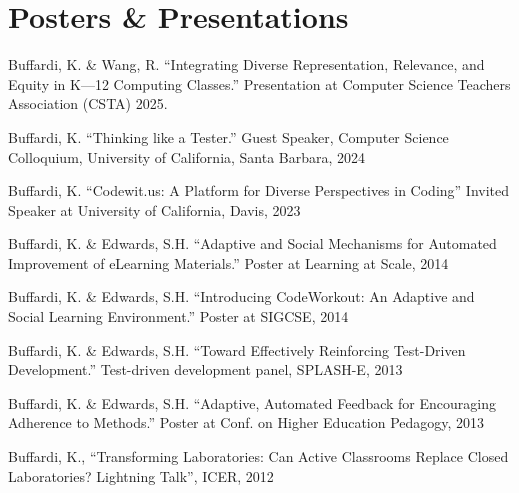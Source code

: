 \documentclass[10pt,letterpaper]{article}
\begin{document}
\section*{Posters \& Presentations}
{\small
\noindent\makebox[2.6em][l]{\textbf{[p12]}}\parbox[t]{\dimexpr\linewidth-2.6em\relax}{Buffardi, K. \& Wang, R. ``Integrating Diverse Representation, Relevance, and Equity in K---12 Computing Classes.'' Presentation at Computer Science Teachers Association (CSTA) 2025.}\par
\vspace{0.15em}
\noindent\makebox[2.6em][l]{\textbf{[p11]}}\parbox[t]{\dimexpr\linewidth-2.6em\relax}{Buffardi, K. ``Thinking like a Tester.'' Guest Speaker, Computer Science Colloquium, University of California, Santa Barbara, 2024}\par
\vspace{0.15em}
\noindent\makebox[2.6em][l]{\textbf{[p10]}}\parbox[t]{\dimexpr\linewidth-2.6em\relax}{Buffardi, K. ``Codewit.us: A Platform for Diverse Perspectives in Coding'' Invited Speaker at University of California, Davis, 2023}\par
\vspace{0.15em}
\noindent\makebox[2.6em][l]{\textbf{[p09]}}\parbox[t]{\dimexpr\linewidth-2.6em\relax}{Buffardi, K. \& Edwards, S.H. ``Adaptive and Social Mechanisms for Automated Improvement of eLearning Materials.'' Poster at Learning at Scale, 2014}\par
\vspace{0.15em}
\noindent\makebox[2.6em][l]{\textbf{[p08]}}\parbox[t]{\dimexpr\linewidth-2.6em\relax}{Buffardi, K. \& Edwards, S.H. ``Introducing CodeWorkout: An Adaptive and Social Learning Environment.'' Poster at SIGCSE, 2014}\par
\vspace{0.15em}
\noindent\makebox[2.6em][l]{\textbf{[p07]}}\parbox[t]{\dimexpr\linewidth-2.6em\relax}{Buffardi, K. \& Edwards, S.H. ``Toward Effectively Reinforcing Test-Driven Development.'' Test-driven development panel, SPLASH-E, 2013}\par
\vspace{0.15em}
\noindent\makebox[2.6em][l]{\textbf{[p06]}}\parbox[t]{\dimexpr\linewidth-2.6em\relax}{Buffardi, K. \& Edwards, S.H. ``Adaptive, Automated Feedback for Encouraging Adherence to Methods.'' Poster at Conf. on Higher Education Pedagogy, 2013}\par
\vspace{0.15em}
\noindent\makebox[2.6em][l]{\textbf{[p05]}}\parbox[t]{\dimexpr\linewidth-2.6em\relax}{Buffardi, K., ``Transforming Laboratories: Can Active Classrooms Replace Closed Laboratories? Lightning Talk'', ICER, 2012}\par
}
\end{document}
